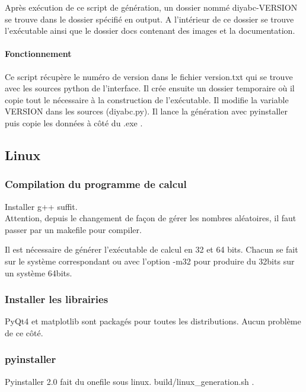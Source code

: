 \documentclass[12pt,a4paper]{article}
\begin{document}
        Après exécution de ce script de génération, un dossier nommé
        diyabc-VERSION se trouve dans le dossier spécifié en output. A
        l'intérieur de ce dossier se trouve l'exécutable ainsi que le dossier
        docs contenant des images et la documentation.

        \paragraph{Fonctionnement}

        Ce script récupère le numéro de version dans le fichier version.txt qui
        se trouve avec les sources python de l'interface. Il crée ensuite un
        dossier temporaire où il copie tout le nécessaire à la construction de
        l'exécutable. Il modifie la variable VERSION dans les sources
        (diyabc.py).  Il lance la génération avec pyinstaller puis copie les
        données à côté du .exe .

    \subsection{Linux}
        \subsubsection{Compilation du programme de calcul}
        Installer g++ suffit.\\

        Attention, depuis le changement de façon de gérer les nombres aléatoires, 
        il faut passer par un makefile pour compiler.

        Il est nécessaire de générer l'exécutable de calcul en 32 et 64 bits.
        Chacun se fait sur le système correspondant ou avec l'option -m32 
        pour produire du 32bits sur un système 64bits.

        \subsubsection{Installer les librairies}

        PyQt4 et matplotlib sont packagés pour toutes les distributions. Aucun
        problème de ce côté.
        \subsubsection{pyinstaller}
        Pyinstaller 2.0 fait du onefile sous linux.
        build/linux\_generation.sh . \\
\end{document}

